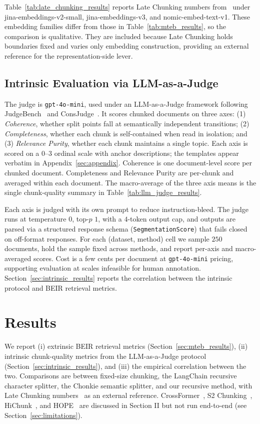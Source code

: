 Table~\ref{tab:late_chunking_results} reports Late Chunking numbers from~\cite{gunther2024late} under jina-embeddings-v2-small, jina-embeddings-v3, and nomic-embed-text-v1. These embedding families differ from those in Table~\ref{tab:mteb_results}, so the comparison is qualitative. They are included because Late Chunking holds boundaries fixed and varies only embedding construction, providing an external reference for the representation-side lever.

\subsection{Intrinsic Evaluation via LLM-as-a-Judge}
\label{sec:intrinsic_eval}
The judge is \texttt{gpt-4o-mini}, used under an LLM-as-a-Judge framework following JudgeBench~\cite{tan2024judgebench} and ConsJudge~\cite{liu2025consjudge}. It scores chunked documents on three axes: (1) \emph{Coherence}, whether split points fall at semantically independent transitions; (2) \emph{Completeness}, whether each chunk is self-contained when read in isolation; and (3) \emph{Relevance Purity}, whether each chunk maintains a single topic. Each axis is scored on a $0$--$3$ ordinal scale with anchor descriptions; the templates appear verbatim in Appendix~\ref{sec:appendix}. Coherence is one document-level score per chunked document. Completeness and Relevance Purity are per-chunk and averaged within each document. The macro-average of the three axis means is the single chunk-quality summary in Table~\ref{tab:llm_judge_results}.

Each axis is judged with its own prompt to reduce instruction-bleed. The judge runs at temperature $0$, top-$p$ $1$, with a $4$-token output cap, and outputs are parsed via a structured response schema (\texttt{SegmentationScore}) that fails closed on off-format responses. For each (dataset, method) cell we sample $250$ documents, hold the sample fixed across methods, and report per-axis and macro-averaged scores. Cost is a few cents per document at \texttt{gpt-4o-mini} pricing, supporting evaluation at scales infeasible for human annotation. Section~\ref{sec:intrinsic_results} reports the correlation between the intrinsic protocol and BEIR retrieval metrics.

\section{Results}
We report (i) extrinsic BEIR retrieval metrics (Section~\ref{sec:mteb_results}), (ii) intrinsic chunk-quality metrics from the LLM-as-a-Judge protocol (Section~\ref{sec:intrinsic_results}), and (iii) the empirical correlation between the two. Comparisons are between fixed-size chunking, the LangChain recursive character splitter, the Chonkie semantic splitter, and our recursive method, with Late Chunking numbers~\cite{gunther2024late} as an external reference. CrossFormer~\cite{ni2025crossformer}, S2 Chunking~\cite{verma2025s2chunking}, HiChunk~\cite{lu2025hichunk}, and HOPE~\cite{bradland2025hope} are discussed in Section II but not run end-to-end (see Section~\ref{sec:limitations}).

